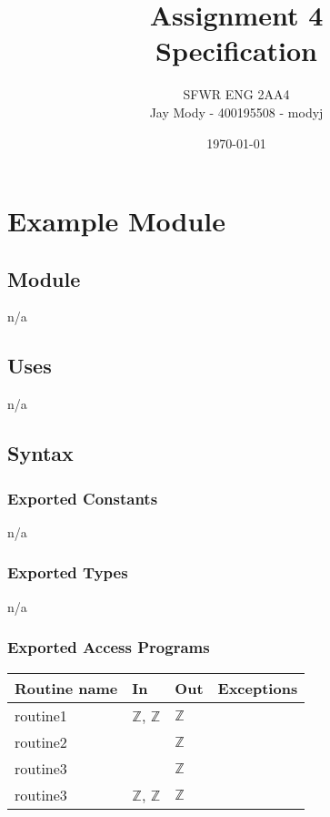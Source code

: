 \documentclass[12pt]{article}
\title{Assignment 4\\Specification}
\author{SFWR ENG 2AA4\\Jay Mody - 400195508 - modyj}
\date{\today}
\begin{document}
\maketitle





\newpage
\section* {Example Module}
\subsection*{Module}
n/a


\subsection* {Uses}
n/a


\subsection* {Syntax}
\subsubsection* {Exported Constants}
n/a

\subsubsection* {Exported Types}
n/a

\subsubsection* {Exported Access Programs}
\begin{tabular}{| l | l | l | l |}
\hline
\textbf{Routine name} & \textbf{In} & \textbf{Out} & \textbf{Exceptions}\\
\hline
routine1 & $\mathbb{Z}$, $\mathbb{Z}$ & $\mathbb{Z}$ & \\
\hline
routine2 & ~ & $\mathbb{Z}$ & ~\\
\hline
routine3 & ~ & $\mathbb{Z}$ & ~\\
\hline
routine3 & $\mathbb{Z}$, $\mathbb{Z}$ & $\mathbb{Z}$ & ~\\
\hline
\end{tabular}
\end{document}
